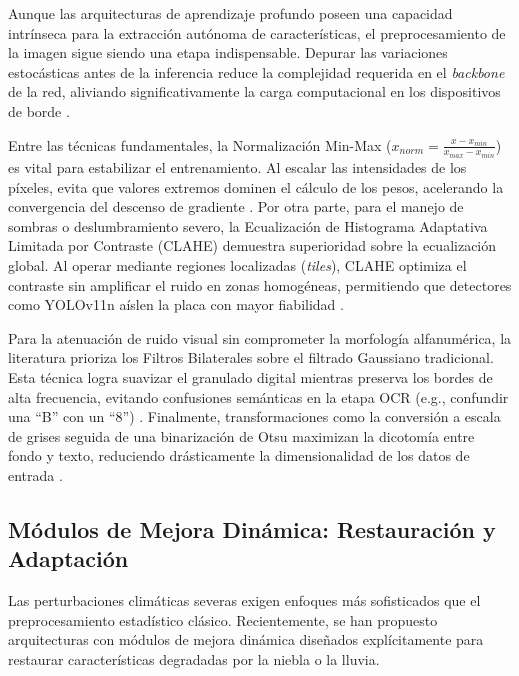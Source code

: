 Aunque las arquitecturas de aprendizaje profundo poseen una capacidad intrínseca para 
la extracción autónoma de características, el preprocesamiento de la imagen sigue 
siendo una etapa indispensable. Depurar las variaciones estocásticas antes de la 
inferencia reduce la complejidad requerida en el \textit{backbone} de la red, 
aliviando significativamente la carga computacional en los dispositivos de borde 
\parencite{kuyunsaDeepLearningEnhancedAutomatic2025, xiongLicensePlateRecognition2026}.

Entre las técnicas fundamentales, la Normalización Min-Max ($x_{norm} = \frac{x - x_{min}}{x_{max} - x_{min}}$) 
es vital para estabilizar el entrenamiento. Al escalar las intensidades de los píxeles, 
evita que valores extremos dominen el cálculo de los pesos, acelerando la convergencia 
del descenso de gradiente \parencite{kuyunsaDeepLearningEnhancedAutomatic2025}. 
Por otra parte, para el manejo de sombras o deslumbramiento severo, la Ecualización 
de Histograma Adaptativa Limitada por Contraste (CLAHE) demuestra superioridad sobre la 
ecualización global. Al operar mediante regiones localizadas (\textit{tiles}), CLAHE 
optimiza el contraste sin amplificar el ruido en zonas homogéneas, permitiendo que 
detectores como YOLOv11n aíslen la placa con mayor fiabilidad 
\parencite{suhartoComparativeEvaluationYOLObased2025}.

Para la atenuación de ruido visual sin comprometer la morfología alfanumérica, la 
literatura prioriza los Filtros Bilaterales sobre el filtrado Gaussiano tradicional. 
Esta técnica logra suavizar el granulado digital mientras preserva los bordes de alta 
frecuencia, evitando confusiones semánticas en la etapa OCR (e.g., confundir una ``B'' 
con un ``8'') \parencite{kuyunsaDeepLearningEnhancedAutomatic2025, xiongLicensePlateRecognition2026}. 
Finalmente, transformaciones como la conversión a escala de grises seguida de una 
binarización de Otsu maximizan la dicotomía entre fondo y texto, reduciendo drásticamente 
la dimensionalidad de los datos de entrada 
\parencite{kuyunsaDeepLearningEnhancedAutomatic2025, suhartoComparativeEvaluationYOLObased2025}.

\subsection{Módulos de Mejora Dinámica: Restauración y Adaptación}

Las perturbaciones climáticas severas exigen enfoques más sofisticados que el preprocesamiento 
estadístico clásico. Recientemente, se han propuesto arquitecturas con módulos de mejora 
dinámica diseñados explícitamente para restaurar características degradadas por la niebla 
o la lluvia.

